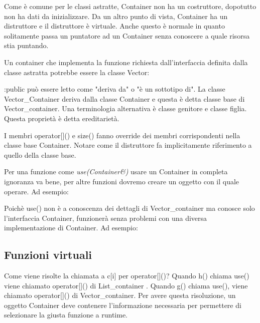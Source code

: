 \documentclass[11pt,a4paper]{book}
\begin{document}
Come è comune per le classi astratte, Container non ha un costruttore, dopotutto non ha dati da inizializzare. Da un altro punto di vista, Container ha un distruttore e il distruttore è virtuale. Anche questo è normale in quanto solitamente passa un puntatore ad un Container senza conoscere a quale risorsa stia puntando.

Un container che implementa la funzione richiesta dall'interfaccia definita dalla classe astratta potrebbe essere la classe Vector:
\label{code: 029}

:public può essere letto come "deriva da" o "è un sottotipo di". La classe Vector\_Container deriva dalla classe Container e questa è detta classe base di Vector\_container. Una terminologia alternativa è classe genitore e classe figlia. Questa proprietà è detta ereditarietà.

I membri operator[]() e size() fanno override dei membri corrispondenti nella classe base Container. Notare come il distruttore fa implicitamente riferimento a quello della classe base.

Per una funzione come \emph{use(Container\&)} usare un Container in completa ignoranza va bene, per altre funzioni dovremo creare un oggetto con il quale operare. Ad esempio:
\label{code: 030}

Poichè use() non è a conoscenza dei dettagli di Vector\_container ma conosce solo l'interfaccia Container, funzionerà senza problemi con una diversa implementazione di Container. Ad esempio:
\label{code: 031}

\subsection{Funzioni virtuali}
\label{code: 032}
Come viene risolte la chiamata a c[i] per operator[]()? Quando h() chiama use() viene chiamato operator[]() di List\_container . Quando g() chiama use(), viene chiamato operator[]() di Vector\_container. Per avere questa risoluzione, un oggetto Container deve contenere l'informazione necessaria per permettere di selezionare la giusta funzione a runtime.
\end{document}

